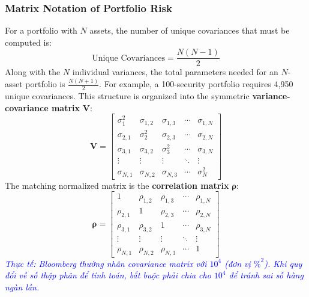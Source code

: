 \subsubsection{Matrix Notation of Portfolio Risk}
For a portfolio with $N$ assets, the number of unique covariances that must be computed is:
\begin{equation}
	\text{Unique Covariances} = \frac{N(N-1)}{2}
	\label{eq:unique_covariances_m8}
\end{equation}
Along with the $N$ individual variances, the total parameters needed for an $N$-asset portfolio is $\frac{N(N+1)}{2}$. For example, a 100-security portfolio requires 4,950 unique covariances.
This structure is organized into the symmetric \textbf{variance-covariance matrix} $\mathbf{V}$:
\begin{equation}
	\mathbf{V} = \begin{bmatrix}
		\sigma_1^2 & \sigma_{1,2} & \sigma_{1,3} & \cdots & \sigma_{1,N} \\
		\sigma_{2,1} & \sigma_2^2 & \sigma_{2,3} & \cdots & \sigma_{2,N} \\
		\sigma_{3,1} & \sigma_{3,2} & \sigma_3^2 & \cdots & \sigma_{3,N} \\
		\vdots & \vdots & \vdots & \ddots & \vdots \\
		\sigma_{N,1} & \sigma_{N,2} & \sigma_{N,3} & \cdots & \sigma_N^2
	\end{bmatrix}
	\label{eq:covariance_matrix_m8}
\end{equation}
The matching normalized matrix is the \textbf{correlation matrix} $\boldsymbol{\rho}$:
\begin{equation}
	\boldsymbol{\rho} = \begin{bmatrix}
		1 & \rho_{1,2} & \rho_{1,3} & \cdots & \rho_{1,N} \\
		\rho_{2,1} & 1 & \rho_{2,3} & \cdots & \rho_{2,N} \\
		\rho_{3,1} & \rho_{3,2} & 1 & \cdots & \rho_{3,N} \\
		\vdots & \vdots & \vdots & \ddots & \vdots \\
		\rho_{N,1} & \rho_{N,2} & \rho_{N,3} & \cdots & 1
	\end{bmatrix}
	\label{eq:correlation_matrix_m8}
\end{equation}
\textcolor{blue}{\textit{Thực tế: Bloomberg thường nhân covariance matrix với $10^4$ (đơn vị $\%^2$). Khi quy đổi về số thập phân để tính toán, bắt buộc phải chia cho $10^4$ để tránh sai số hàng ngàn lần.}}
